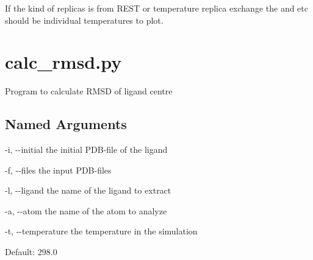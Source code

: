 \documentclass[letterpaper,10pt,english]{sphinxmanual}
\begin{document}
If the kind of replicas is from REST or temperature replica exchange the  and  etc should be individual temperatures to plot.


\section{calc\_rmsd.py}
\label{\detokenize{tools:calc-rmsd-py}}

Program to calculate RMSD of ligand centre


%
\begin{sphinxVerbatim}[commandchars=\\\{\}]
  \PYG{p}{[}\PYG{p}{]} \PYG{p}{[} \PYG{p}{]} \PYG{p}{[}  \PYG{p}{[} \PYG{p}{]}\PYG{p}{]} \PYG{p}{[} \PYG{p}{]}
                    \PYG{p}{[} \PYG{p}{]} \PYG{p}{[} \PYG{p}{]}
\end{sphinxVerbatim}


\subsection{Named Arguments}
\label{\detokenize{tools:Named Arguments}}\begin{optionlist}{3cm}
\item [-i, -{-}initial]  
the initial PDB-file of the ligand
\item [-f, -{-}files]  
the input PDB-files
\item [-l, -{-}ligand]  
the name of the ligand to extract
\item [-a, -{-}atom]  
the name of the atom to analyze
\item [-t, -{-}temperature]  
the temperature in the simulation

Default: 298.0
\end{optionlist}


%
\begin{sphinxVerbatim}[commandchars=\\\{\}]
      
        
\end{sphinxVerbatim}
\end{document}
